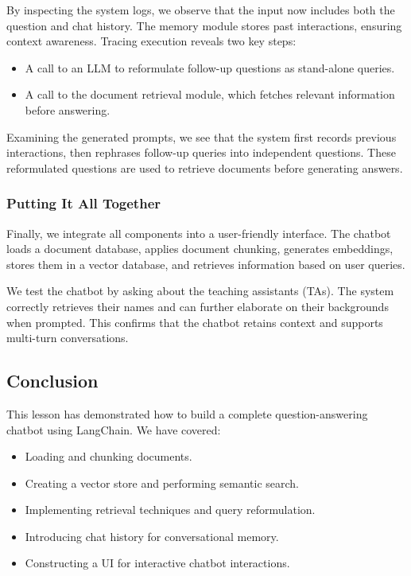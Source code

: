 \documentclass{article}
\begin{document}
By inspecting the system logs, we observe that the input now includes both the question and chat history. The memory module stores past interactions, ensuring context awareness. Tracing execution reveals two key steps:
\begin{itemize}
    \item A call to an LLM to reformulate follow-up questions as stand-alone queries.
    \item A call to the document retrieval module, which fetches relevant information before answering.
\end{itemize}

Examining the generated prompts, we see that the system first records previous interactions, then rephrases follow-up queries into independent questions. These reformulated questions are used to retrieve documents before generating answers.

\subsubsection{Putting It All Together}

Finally, we integrate all components into a user-friendly interface. The chatbot loads a document database, applies document chunking, generates embeddings, stores them in a vector database, and retrieves information based on user queries.

We test the chatbot by asking about the teaching assistants (TAs). The system correctly retrieves their names and can further elaborate on their backgrounds when prompted. This confirms that the chatbot retains context and supports multi-turn conversations.

\subsection{Conclusion}

This lesson has demonstrated how to build a complete question-answering chatbot using LangChain. We have covered:
\begin{itemize}
    \item Loading and chunking documents.
    \item Creating a vector store and performing semantic search.
    \item Implementing retrieval techniques and query reformulation.
    \item Introducing chat history for conversational memory.
    \item Constructing a UI for interactive chatbot interactions.
\end{itemize}
\end{document}

